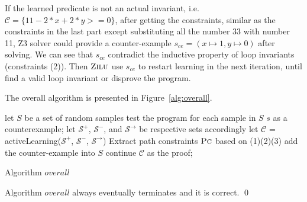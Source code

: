 If the learned predicate is not an actual invariant, i.e. $\mathcal{C} = \{11-2*x+2*y>=0\}$,
after getting the constraints, similar as the constraints in the last part except substituting all the number 33 with number 11, 
Z3 solver could provide a counter-example $s_{ce} = (x \mapsto 1, y \mapsto 0)$ after solving.
We can see that $s_{ce}$ contradict the inductive property of loop invariants (constraints (2)).
Then $\textsc{Zilu}$ use $s_{ce}$ to restart learning in the next iteration, until find a valid loop invariant or disprove the program.


 
The overall algorithm is presented in Figure~\ref{alg:overall}.
\begin{algorithm}[!h]
\SetAlgoVlined
\Indm
{}
\Indp
let $S$ be a set of random samples\;
 {
    test the program for each sample in $S$\;
     {
        \Return $s$ as a counterexample;
    }
    let $\mathcal{S}^+$, $\mathcal{S}^-$, and $\mathcal{S}^\rightarrow$ be respective sets accordingly\;
    let $\mathcal{C}$ = activeLearning($\mathcal{S}^+$, $\mathcal{S}^-$, $\mathcal{S}^\rightarrow$)\;
    Extract path constraints $\textsc{Pc}$ based on (1)(2)(3)\;
     {
         {
            add the counter-example into $S$\;
            continue\;
        }
    }
    \Return $\mathcal{C}$ as the proof;
}
\caption{Algorithm $overall$}
\label{alg:overall}
\end{algorithm}




\begin{theorem}
Algorithm $overall$ always eventually terminates and it is correct. \hfill \qed
\end{theorem}


